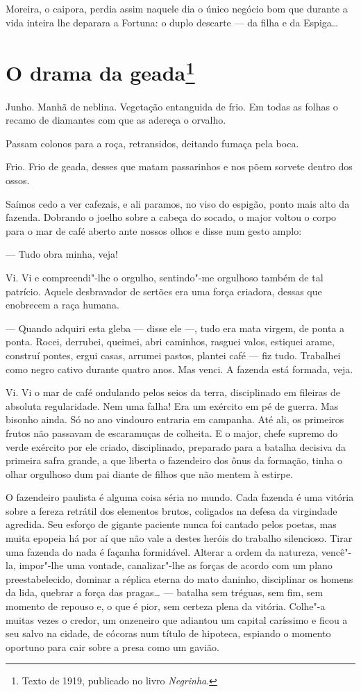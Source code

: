 Moreira, o caipora, perdia assim naquele dia o único negócio bom que
durante a vida inteira lhe deparara a Fortuna: o duplo descarte --- da
filha e da Espiga\ldots{}

\chapter{O drama da geada\footnote[*]{Texto de 1919, publicado no livro \emph{Negrinha}.}}

Junho. Manhã de neblina. Vegetação entanguida de frio. Em todas as
folhas o recamo de diamantes com que as adereça o orvalho.

Passam colonos para a roça, retransidos, deitando fumaça pela boca.

Frio. Frio de geada, desses que matam passarinhos e nos põem sorvete
dentro dos ossos.

Saímos cedo a ver cafezais, e ali paramos, no viso do espigão, ponto
mais alto da fazenda. Dobrando o joelho sobre a cabeça do socado, o
major voltou o corpo para o mar de café aberto ante nossos olhos e disse
num gesto amplo:

--- Tudo obra minha, veja!

Vi. Vi e compreendi"-lhe o orgulho, sentindo"-me orgulhoso também de tal
patrício. Aquele desbravador de sertões era uma força criadora, dessas
que enobrecem a raça humana.

--- Quando adquiri esta gleba --- disse ele ---, tudo era mata virgem,
de ponta a ponta. Rocei, derrubei, queimei, abri caminhos, rasguei
valos, estiquei arame, construí pontes, ergui casas, arrumei pastos,
plantei café --- fiz tudo. Trabalhei como negro cativo durante quatro
anos. Mas venci. A fazenda está formada, veja.

Vi. Vi o mar de café ondulando pelos seios da terra, disciplinado em
fileiras de absoluta regularidade. Nem uma falha! Era um exército em pé
de guerra. Mas bisonho ainda. Só no ano vindouro entraria em campanha.
Até ali, os primeiros frutos não passavam de escaramuças de colheita. E
o major, chefe supremo do verde exército por ele criado, disciplinado,
preparado para a batalha decisiva da primeira safra grande, a que
liberta o fazendeiro dos ônus da formação, tinha o olhar orgulhoso dum
pai diante de filhos que não mentem à estirpe.

O fazendeiro paulista é alguma coisa séria no mundo. Cada fazenda é uma
vitória sobre a fereza retrátil dos elementos brutos, coligados na
defesa da virgindade agredida. Seu esforço de gigante paciente nunca foi
cantado pelos poetas, mas muita epopeia há por aí que não vale a destes
heróis do trabalho silencioso. Tirar uma fazenda do nada é façanha
formidável. Alterar a ordem da natureza, vencê"-la, impor"-lhe uma
vontade, canalizar"-lhe as forças de acordo com um plano preestabelecido,
dominar a réplica eterna do mato daninho, disciplinar os homens da lida,
quebrar a força das pragas\ldots{} --- batalha sem tréguas, sem fim, sem
momento de repouso e, o que é pior, sem certeza plena da vitória.
Colhe"-a muitas vezes o credor, um onzeneiro que adiantou um capital
caríssimo e ficou a seu salvo na cidade, de cócoras num título de
hipoteca, espiando o momento oportuno para cair sobre a presa como um
gavião.

